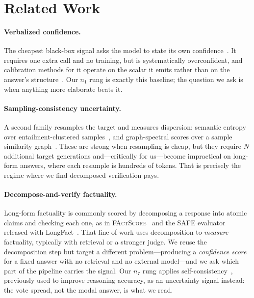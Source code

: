 \documentclass[11pt]{article}
\begin{document}
\section{Related Work}\label{sec:related}
\paragraph{Verbalized confidence.} The cheapest black-box signal asks the model to state its own
confidence~\citep{lin2022teaching,tian2023just,kadavath2022language}. It requires one extra call
and no training, but is systematically overconfident, and calibration methods for it operate on
the scalar it emits rather than on the answer's structure~\citep{guo2017calibration}. Our $n_1$
rung is exactly this baseline; the question we ask is when anything more elaborate beats it.

\paragraph{Sampling-consistency uncertainty.} A second family resamples the target and measures
dispersion: semantic entropy over entailment-clustered
samples~\citep{kuhn2023semantic,farquhar2024detecting}, and graph-spectral scores over a sample
similarity graph~\citep{lin2024generating}. These are strong when resampling is cheap, but they
require $N$ additional target generations and---critically for us---become impractical on
long-form answers, where each resample is hundreds of tokens. That is precisely the regime where
we find decomposed verification pays.

\paragraph{Decompose-and-verify factuality.} Long-form factuality is commonly scored by
decomposing a response into atomic claims and checking each one, as in
\textsc{FActScore}~\citep{min2023factscore} and the SAFE evaluator released with
LongFact~\citep{wei2024longfact}. That line of work uses decomposition to \emph{measure}
factuality, typically with retrieval or a stronger judge. We reuse the decomposition step but
target a different problem---producing a \emph{confidence score} for a fixed answer with no
retrieval and no external model---and we ask which part of the pipeline carries the signal.
Our $n_7$ rung applies self-consistency~\citep{wang2023selfconsistency}, previously used to
improve reasoning accuracy, as an uncertainty signal instead: the vote spread, not the modal
answer, is what we read.
\end{document}
